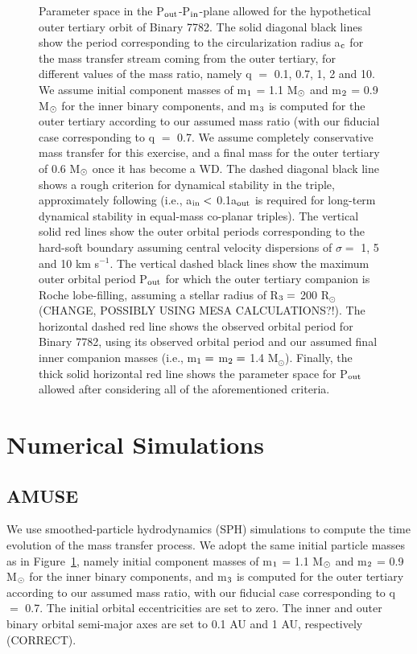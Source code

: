 \documentclass{aastex62}
\begin{document}
\begin{figure}[ht!]
\caption{Parameter space in the P$_{\rm out}$-P$_{\rm in}$-plane allowed for the hypothetical outer tertiary orbit of Binary 7782.  The solid diagonal black lines show the period corresponding to the circularization radius a$_{\rm c}$ for the mass transfer stream coming from the outer tertiary, for different values of the mass ratio, namely q $=$ 0.1, 0.7, 1, 2 and 10.  We assume initial component masses of m$_{\rm 1}$ = 1.1 M$_{\rm \odot}$ and m$_{\rm 2}$ = 0.9 M$_{\rm \odot}$ for the inner binary components, and m$_{\rm 3}$ is computed for the outer tertiary according to our assumed mass ratio (with our fiducial case corresponding to q $=$ 0.7.  We assume completely conservative mass transfer for this exercise, and a final mass for the outer tertiary of 0.6 M$_{\rm \odot}$ once it has become a WD.  The dashed diagonal black line shows a rough criterion for dynamical stability in the triple, approximately following \citet{mardling99} (i.e., a$_{\rm in} <$ 0.1a$_{\rm out}$ is required for long-term dynamical stability in equal-mass co-planar triples).  The vertical solid red lines show the outer orbital periods corresponding to the hard-soft boundary assuming central velocity dispersions of $\sigma =$ 1, 5 and 10 km s$^{-1}$.  The vertical dashed black lines show the maximum outer orbital period P$_{\rm out}$ for which the outer tertiary companion is Roche lobe-filling, assuming a stellar radius of R$_{\rm 3} =$ 200 R$_{\odot}$ (CHANGE, POSSIBLY USING MESA CALCULATIONS?!).  The horizontal dashed red line shows the observed orbital period for Binary 7782, using its observed orbital period and our assumed final inner companion masses (i.e., m$_{\rm 1} =$ m$_{\rm 2} =$ 1.4 M$_{\odot}$).  Finally, the thick solid horizontal red line shows the parameter space for P$_{\rm out}$ allowed after considering all of the aforementioned criteria.
\label{fig:fig1}}
\end{figure}

\section{Numerical Simulations} \label{sims}

\subsection{AMUSE} \label{amuse}

We use smoothed-particle hydrodynamics (SPH) simulations to compute the time evolution of the mass transfer process.  We adopt the same initial particle masses as in Figure~\ref{fig:fig1}, namely initial component masses of m$_{\rm 1}$ = 1.1 M$_{\rm \odot}$ and m$_{\rm 2}$ = 0.9 M$_{\rm \odot}$ for the inner binary components, and m$_{\rm 3}$ is computed for the outer tertiary according to our assumed mass ratio, with our fiducial case corresponding to q $=$ 0.7.  The initial orbital eccentricities are set to zero.  The inner and outer binary orbital semi-major axes are set to 0.1 AU and 1 AU, respectively (CORRECT).  
\end{document}
